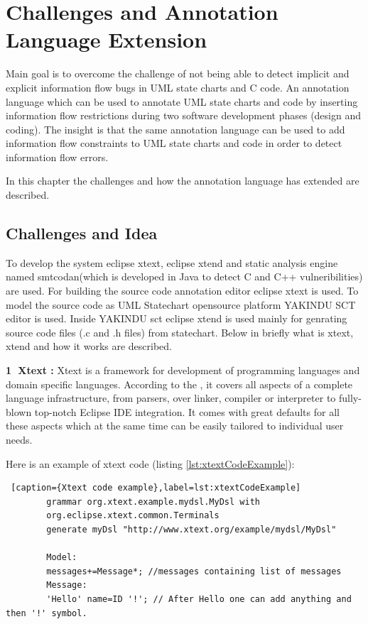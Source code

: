 \chapter{ Challenges and Annotation Language Extension}
Main goal is to overcome the challenge of not being able
to detect implicit and explicit information flow bugs in UML state charts and C code. An annotation language
which can be used to annotate UML state charts and code by inserting information flow
restrictions during two software development phases (design
and coding). The insight is that the same annotation language can be used to add information flow constraints to UML state charts and code in order to detect information flow errors.
 
In this chapter the challenges and how the annotation language has extended are described.

\section{Challenges and Idea}

To develop the system eclipse xtext, eclipse xtend and static analysis engine named smtcodan(which is developed in Java to detect C and C++ vulneribilities) are used. For building the source code annotation editor eclipse xtext is used. To model the source code as UML Statechart opensource platform YAKINDU SCT editor is used. Inside YAKINDU sct eclipse xtend is used mainly for genrating source code files (.c and .h files) from statechart. Below in briefly what is xtext, xtend and how it works are described.

\textbf{\textcircled{1} Xtext :} Xtext is a framework for development of programming languages and domain specific languages. According to the \cite{ref_17_xtext:grammar}, it covers all aspects of a complete language infrastructure, from parsers, over linker, compiler or interpreter to fully-blown top-notch Eclipse IDE integration. It comes with great defaults for all these aspects which at the same time can be easily tailored to individual user needs.
	
	Here is an example of xtext code (listing \ref{lst:xtextCodeExample}):
		\begin{lstlisting} [caption={Xtext code example},label=lst:xtextCodeExample]
		grammar org.xtext.example.mydsl.MyDsl with 
		org.eclipse.xtext.common.Terminals		
		generate myDsl "http://www.xtext.org/example/mydsl/MyDsl"
		
		Model:
		messages+=Message*; //messages containing list of messages		
		Message:
		'Hello' name=ID '!'; // After Hello one can add anything and then '!' symbol.
		
		\end{lstlisting}
		 
